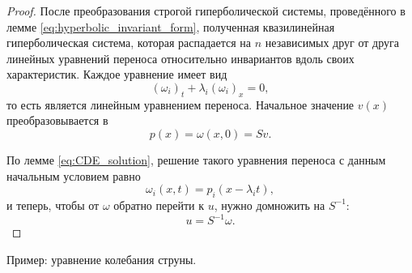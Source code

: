 \documentclass[../main.tex]{subfile}
\begin{document}
\begin{proof}
	После преобразования строгой гиперболической системы, проведённого в
	лемме \eqref{eq:hyperbolic_invariant_form}, полученная квазилинейная
	гиперболическая система, которая распадается на $n$ независимых друг от
	друга линейных уравнений переноса относительно инвариантов вдоль своих
	характеристик. Каждое уравнение имеет вид
	\[(\omega_i)_t+\lambda_i(\omega_i)_x=0,\]
	то есть является линейным уравнением переноса. Начальное значение $v(x)$
	преобразовывается в
	\[p(x)=\omega(x,0)=Sv.\]

	По лемме \eqref{eq:CDE_solution}, решение такого уравнения переноса
	с данным начальным условием равно
	\[\omega_i(x,t)=p_i(x-\lambda_i t),\]
	и теперь, чтобы от $\omega$ обратно перейти к $u$, нужно домножить
	на $S^{-1}$:
	\[u=S^{-1}\omega.\]
\end{proof}

Пример: уравнение колебания струны.
\end{document}
